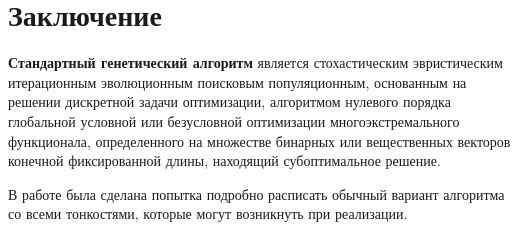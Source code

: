 \chapter*{Заключение}

\textbf{Стандартный генетический алгоритм} является стохастическим эвристическим итерационным эволюционным поисковым популяционным, основанным на решении дискретной задачи оптимизации, алгоритмом нулевого порядка глобальной условной или безусловной оптимизации многоэкстремального функционала, определенного на множестве бинарных или вещественных векторов конечной фиксированной длины, находящий субоптимальное решение.

В работе была сделана попытка подробно расписать обычный вариант алгоритма со всеми тонкостями, которые могут возникнуть при реализации.

\clearpage